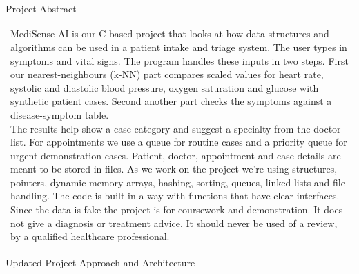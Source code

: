 \documentclass[12pt,a4paper]{article}
\newcommand{\sectiontitle}[1]{%
    {\color{GEUBlue}
    \fontsize{18}{22}\selectfont #1}
}
\newcommand{\answerbox}[2]{%
    \begin{tabularx}{\textwidth}{
        |>{\raggedright\arraybackslash}X|}
        \hline
        \parbox[t][#1][t]{\dimexpr\linewidth-12pt\relax}{
            \vspace{5pt}
            \fontsize{11}{13}\selectfont #2
        }\\
        \hline
    \end{tabularx}
}
\begin{document}
\vspace{0.70cm}

\sectiontitle{Project Abstract }

\vspace{0.05cm}

\vspace{0.12cm}

\answerbox{6.00cm}{MediSense AI is our C-based project that looks at how data structures and algorithms can be used in a patient intake and triage system. The user types in symptoms and vital signs. The program handles these inputs in two steps. First our nearest-neighbours (k-NN) part compares scaled values for heart rate, systolic and diastolic blood pressure, oxygen saturation and glucose with synthetic patient cases. Second another part checks the symptoms against a disease-symptom table.\\
The results help show a case category and suggest a specialty from the doctor list. For appointments we use a queue for routine cases and a priority queue for urgent demonstration cases. Patient, doctor, appointment and case details are meant to be stored in files.
As we work on the project we’re using structures, pointers, dynamic memory arrays, hashing, sorting, queues, linked lists and file handling. The code is built in a way with functions that have clear interfaces. Since the data is fake the project is for coursework and demonstration. It does not give a diagnosis or treatment advice. It should never be used of a review, by a qualified healthcare professional.}

\vspace{0.70cm}

\sectiontitle{Updated Project Approach and Architecture }

\vspace{1mm}
\end{document}
